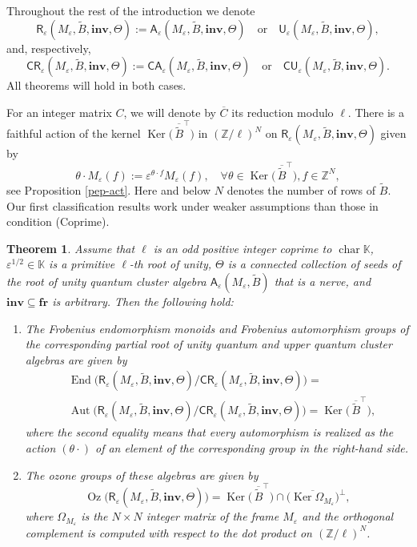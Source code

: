 \documentclass[11pt]{amsart}
\theoremstyle{plain}
\newcommand \prref[1]{Proposition \ref{p#1}}
\newtheorem{thmintro}{Theorem}
\def \KK {{\mathbb C}}
\def \KK {{\mathbb K}}
\def \Zset {{\mathbb Z}}
\def \A {{\boldsymbol{\mathsf A}}}
\def \C {{\boldsymbol{\mathsf C}}}
\def \R {{\boldsymbol{\mathsf R}}}
\def \U {{\boldsymbol{\mathsf U}}}
\def \B  {{\widetilde{B}}}
\newcommand \fr {{\mathbf{fr}}}
\newcommand \inv {{\mathbf{inv}}}
\def \Om {\Omega}
\def \ep {\varepsilon}
\def \ol {\overline}
\DeclareMathOperator \Aut { {\mathrm{Aut}} }
\DeclareMathOperator \Oz { {\mathrm{Oz}}}
\DeclareMathOperator \charr { {\mathrm{char}} }
\DeclareMathOperator \Ker { {\mathrm{Ker}} }
\DeclareMathOperator \End { {\mathrm{End}} }
\begin{document}
Throughout the rest of the introduction we denote 
\[
\R_\ep(M_\ep, \B, \inv, \Theta):= \A_\ep(M_\ep, \B, \inv, \Theta) \quad \mbox{or}
\quad \U_\ep(M_\ep, \B, \inv, \Theta),
\]
and, respectively,
\[
\C\R_\ep(M_\ep, \B, \inv, \Theta):= \C\A_\ep(M_\ep, \B, \inv, \Theta) \quad \mbox{or}
\quad \C\U_\ep(M_\ep, \B, \inv, \Theta).
\]
All theorems will hold in both cases. 

For an integer matrix $C$, we will denote by $\ol{C}$ its reduction modulo $\ell$. 
There is a faithful action of the kernel $\Ker \big( \, \ol{\B}^\top \big)$ in $(\Zset/\ell)^N$ on $\R_\ep(M_\ep,\B, \inv, \Theta)$ given by 
\[
\theta \cdot M_\ep(f) := \ep^{\theta \cdot f} M_\ep(f), \quad \forall 
\theta \in \Ker \big( \, \ol{\B}^\top \big), f \in \Zset^N,
\]
see \prref{ep-act}. Here and below $N$ denotes the number of rows of $\B$. Our first classification results work under weaker 
assumptions than those in condition (Coprime). 

\begin{thmintro} 
\label{thmA}
 Assume that $\ell$ is an odd positive integer coprime to $\charr \KK$, $\ep^{1/2} \in \KK$ is a primitive $\ell$-th root of unity, $\Theta$ is a connected collection of seeds of the root of unity quantum cluster algebra $\A_\ep(M_\ep, \B)$ that is a nerve, and $\inv \subseteq \fr$ is arbitrary. Then the following hold:
 \begin{enumerate}
 \item[(i)] The Frobenius endomorphism monoids and Frobenius automorphism groups of the corresponding partial root of unity quantum and upper quantum cluster algebras are given by 
\begin{align*}
&\End \big( \R_\ep(M_\ep, \B, \inv, \Theta)/
\C\R_\ep(M_\ep, \B, \inv, \Theta) \big) = \\
& \Aut \big( \R_\ep(M_\ep, \B, \inv, \Theta)/
\C\R_\ep(M_\ep, \B, \inv, \Theta) \big) = \Ker \big( \, \ol{\B}^\top \big),
\end{align*}
where the second equality means that every automorphism is realized
as the action $(\theta \cdot)$ of an element of the corresponding group in the right-hand side.
\item[(ii)] The ozone groups of these algebras are given by 
\[
\Oz \big( \R_\ep(M_\ep, \B, \inv, \Theta) \big) = 
\Ker \big( \, \ol{\B}^\top \big) \cap \big( \ol{\Ker \Om_{M_\ep}} \big)^\perp,
\]
where $\Om_{M_\ep}$ is the $N \times N$ integer matrix of the frame $M_\ep$ and the orthogonal complement is computed with respect to the dot product on $(\Zset/\ell)^N$.
\end{enumerate}
\end{thmintro}
\end{document}
